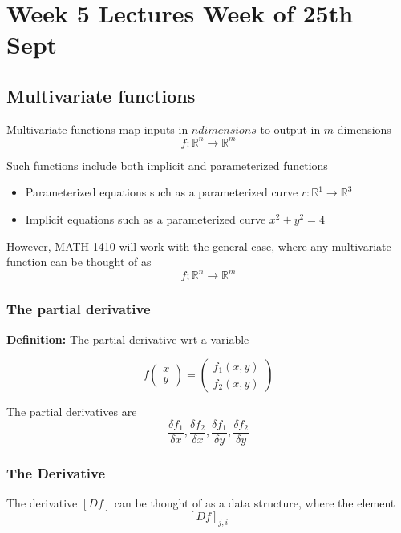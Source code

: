 \chapter{Week 5 Lectures Week of 25th Sept}

\section{Multivariate functions}

Multivariate functions map inputs in $n dimensions$ to output in $m$ dimensions
\[
  f: \mathbb{R}^n \to \mathbb{R}^m
\]  

Such functions include both implicit and parameterized functions
\begin{itemize}
   \item Parameterized equations such as a parameterized curve $r: \mathbb{R}^1 \to \mathbb{R}^3$ 
   \item Implicit equations such as a parameterized curve $x^2 + y^2 = 4$
\end{itemize}

However, MATH-1410 will work with the general case, where any multivariate function can be thought of as \[
  f; \mathbb{R}^n \to \mathbb{R}^m
\]  

\subsection{The partial derivative}

\begin{framed}
   \textbf{Definition:} The partial derivative wrt a variable

   \[
     f \begin{pmatrix} x \\ y \end{pmatrix} = \begin{pmatrix} 
       f_1 (x,y) \\
       f_2 (x,y)
     \end{pmatrix}
   \] 

   The partial derivatives are \[
     \frac{\delta f_1}{\delta x}, \frac{\delta f_2}{\delta x},\frac{\delta f_1}{\delta y}, \frac{\delta f_2}{\delta y}
   \] 
\end{framed}

\subsection{The Derivative}

The derivative $[Df]$ can be thought of as a data structure, where the element \[
   [Df]_{j, i}
\] 

